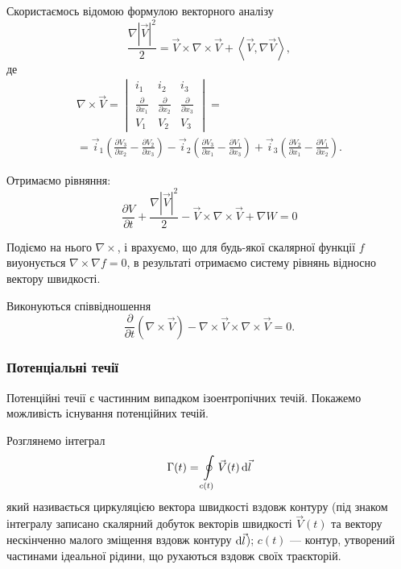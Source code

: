 Скористаємось відомою формулою векторного аналізу
\begin{equation}
	\frac{\nabla \left|\vec V\right|^2}{2} = \vec V \times \nabla \times \vec V + \left \langle \vec V, \nabla \vec V \right \rangle,
\end{equation}
де
\begin{multline}
	\nabla \times \vec V = 
	\begin{vmatrix} 
		i_1 & i_2 & i_3 \\
		\frac{\partial}{\partial x_1} & \frac{\partial}{\partial x_2} & \frac{\partial}{\partial x_3} \\
		V_1 & V_2 & V_3
	\end{vmatrix} = \\
	= \vec i_1 \left( \frac{\partial V_3}{\partial x_2} - \frac{\partial V_2}{\partial x_3} \right) - \vec i_2 \left( \frac{\partial V_3}{\partial x_1} - \frac{\partial V_1}{\partial x_3} \right) + \vec i_3 \left( \frac{\partial V_2}{\partial x_1} - \frac{\partial V_1}{\partial x_2} \right).
\end{multline}

Отримаємо рівняння:
\begin{equation}
	\label{eq:3.3.64}
	\frac{\partial V}{\partial t} + \frac{\nabla \left| \vec V\right|^2}{2} - \vec V \times \nabla \times \vec V + \nabla W = 0
\end{equation}

Подіємо на нього $\nabla \times$, і врахуємо, що для будь-якої скалярної функції $f$ виуонується $\nabla \times \nabla f = 0$, в результаті отримаємо систему рівнянь відносно вектору швидкості.

\begin{th_equation}
	Виконуються співвідношення
	\begin{equation}
		\frac{\partial}{\partial t} \left(\nabla \times \vec V\right) - \nabla \times \vec V \times \nabla \times \vec V = 0.
	\end{equation}
\end{th_equation}

\subsubsection{Потенціальні течії}

Потенційні течії є частинним випадком ізоентропічних течій. Покажемо можливість існування потенційних течій. \medskip

Розглянемо інтеграл	
\begin{equation}
	\Gamma(t) = \displaystyle\oint\limits_{c(t)} \vec V(t) \mathop{}\!\mathrm{d} \vec l
\end{equation}
який називається циркуляцією вектора швидкості вздовж контуру (під знаком інтегралу записано скалярний добуток векторів швидкості $\vec V(t)$ та вектору нескінченно малого зміщення вздовж контуру $\mathop{}\!\mathrm{d} \vec l$); $c(t)$ --- контур, утворений частинами ідеальної рідини, що рухаються вздовж своїх траєкторій. \medskip

